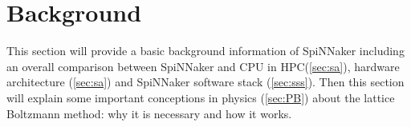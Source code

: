 \section{Background} \label{sec:bg}


This section will provide a basic background information of SpiNNaker including an overall comparison between SpiNNaker and CPU in HPC(\ref{sec:sa}), hardware architecture (\ref{sec:sa}) and SpiNNaker software stack (\ref{sec:sss}). Then this section will explain some important conceptions in physics (\ref{sec:PB}) about the lattice Boltzmann method: why it is necessary and how it works. \\





